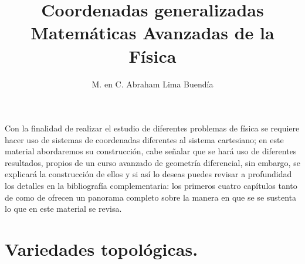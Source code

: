 
\title{Coordenadas generalizadas\\ \large{Matemáticas Avanzadas de la Física}\vspace{-3ex}}
\author{M. en C. Abraham Lima Buendía}
\date{ }

\vspace{-4cm}
\maketitle
\fontsize{14}{14}\selectfont
Con la finalidad de realizar el estudio de diferentes problemas de física se requiere hacer uso de sistemas de coordenadas diferentes al sistema cartesiano; en este material abordaremos su construcción, cabe señalar que se hará uso de diferentes resultados, propios de un curso avanzado de geometría diferencial, sin  embargo, se explicará la construcción de ellos y si así lo deseas puedes revisar a profundidad los detalles en la bibliografía complementaria: los primeros cuatro capítulos tanto de \cite{Bar} como de \cite{Nguyen} ofrecen un panorama completo sobre la manera en que se se sustenta lo que en este material se revisa.
\section{Variedades topológicas.}

